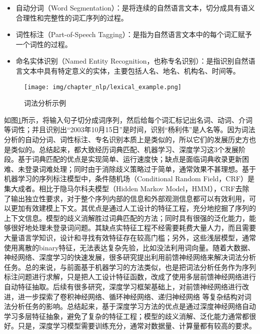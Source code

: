 \documentclass[graybox,envcountchap,sectrefs]{svmono}
\begin{document}
\begin{itemize}
\item 自动分词（Word Segmentation）：是将连续的自然语言文本，切分成具有语义合理性和完整性的词汇序列的过程。
\item 词性标注（Part-of-Speech Tagging）：是指为自然语言文本中的每个词汇赋予一个词性的过程。
\item 命名实体识别（Named Entity Recognition，也称专名识别）：是指识别自然语言文本中具有特定意义的实体，主要包括人名、地名、机构名、时间等。
\end{itemize}

\begin{figure}[h!]
\centering
\texttt{[image: img/chapter\_nlp/lexical\_example.png]}
\caption{词法分析示例}
\label{fig:lexical_example}
\end{figure}

如图\ref{fig:lexical_example}所示，将输入句子切分成词序列，然后给每个词汇标记出名词、动词、介词等词性；并且识别出“2003年10月15日”是时间，识别“杨利伟”是人名等。因为词法分析的自动分词、词性标注、专名识别本质上是类似的，所以它们的发展历史方也是类似的。总结起来，都大致经历词典匹配、机器学习、深度学习这3个发展阶段。基于词典匹配的优点是实现简单、运行速度快；缺点是面临词典收录更新困难、未登录词难处理；同时由于消除歧义策略过于简单，通常效果不甚理想。基于机器学习的序列标注模型中，条件随机场（Conditional Random Field，CRF）\cite{zhao2006improved}\cite{constant2011mwu}\cite{ekbal2008named}是集大成者。相比于隐马尔科夫模型（Hidden Markov Model，HMM）\cite{zhang2003chinese}\cite{kupiec1992robust}\cite{yu2006chinese}\cite{morwal2012named}，CRF去除了输出独立性要求，对于整个序列内部的信息和外部观测信息都可以有效利用，可以更加有效建模上下文。其优点是通过人工设计的特征工程，充分地挖掘了序列的上下文信息。模型的歧义消解胜过词典匹配的方法；同时具有很强的泛化能力，能够很好地处理未登录词问题。其缺点实特征工程不经需要耗费大量人力，而且需要大量语言学知识，设计和寻找有效特征存在较高门槛；另外，这些浅层模型，通常使用离散的binary特征，无法表达复杂先验，比如没法利用词向量。随着大数据、神经网络、深度学习的快速发展，很多研究提出利用前馈神经网络来解决词法分析\cite{collobert2011natural}\cite{zheng2013deep}任务。总的来说，与前面基于机器学习的方法类似，也是把词法分析任务作为序列标注问题进行求解，只是把人工设计特征函数，改成了使用多层前馈神经网络进行自动特征抽取。后续有很多研究，深度学习框架基础上，对前馈神经网络进行改进，进一步探索了卷积神经网络\cite{wu2019neural}、循环神经网络\cite{chen2015long}、递归神经网络\cite{chen2015gated} 等复杂结构对词法分析任务的影响。总结起来，基于深度学习方法的优点是通过深度神经网络自动学习多层特征抽象，避免了复杂的特征工程；模型的歧义消解、泛化能力通常都很好。只是，深度学习模型需要训练充分，通常对数据量、计算量都有较高的要求。
\end{document}
